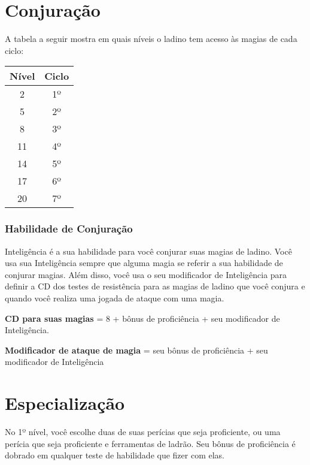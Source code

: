\documentclass{RPG_Adventure}[2021/10/20]
\begin{document}
\begin{multicols}{2}
\section*{Conjuração}%

A tabela a seguir mostra em quais níveis o ladino tem acesso às magias de cada
ciclo:

\begin{center}
\begin{tabular}{|||c||c|||}
    \hline
    \textbf{Nível} & \textbf{Ciclo} \\
    \hline
    2 & 1º \\
    \hline
    5 & 2º \\
    \hline
    8 & 3º \\
    \hline
    11 & 4º \\
    \hline
    14 & 5º \\
    \hline
    17 & 6º \\
    \hline
    20 & 7º \\
    \hline
\end{tabular}
\end{center}


\subsubsection*{Habilidade de Conjuração}%

Inteligência é a sua habilidade para você conjurar suas magias de ladino. Você
usa sua Inteligência sempre que alguma magia se referir a sua habilidade de
conjurar magias. Além disso, você usa o seu modificador de Inteligência para
definir a CD dos testes de resistência para as magias de ladino que você conjura
e quando você realiza uma jogada de ataque com uma magia.

\begin{center}
\textbf{CD para suas magias} = 8 + bônus de proficiência + seu modificador de
Inteligência. \nl

\textbf{Modificador de ataque de magia} = seu bônus de proficiência + seu
modificador de Inteligência
\end{center}

\section*{Especialização}%

No 1º nível, você escolhe duas de suas perícias que seja proficiente, ou uma
perícia que seja proficiente e ferramentas de ladrão. Seu bônus de proficiência
é dobrado em qualquer teste de habilidade que fizer com elas.


\end{multicols}
\end{document}
